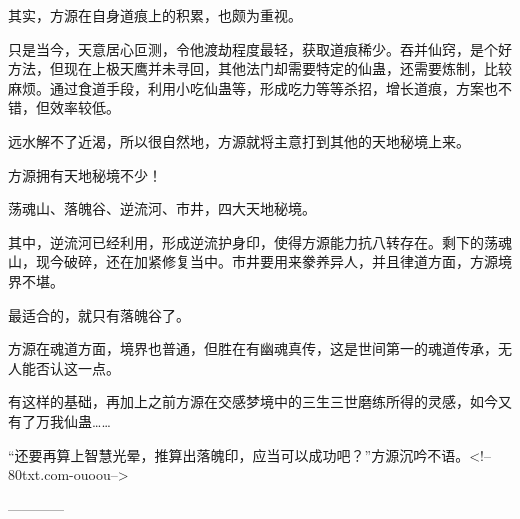 \begin{this_body}
其实，方源在自身道痕上的积累，也颇为重视。

只是当今，天意居心叵测，令他渡劫程度最轻，获取道痕稀少。吞并仙窍，是个好方法，但现在上极天鹰并未寻回，其他法门却需要特定的仙蛊，还需要炼制，比较麻烦。通过食道手段，利用小吃仙蛊等，形成吃力等等杀招，增长道痕，方案也不错，但效率较低。

远水解不了近渴，所以很自然地，方源就将主意打到其他的天地秘境上来。

方源拥有天地秘境不少！

荡魂山、落魄谷、逆流河、市井，四大天地秘境。

其中，逆流河已经利用，形成逆流护身印，使得方源能力抗八转存在。剩下的荡魂山，现今破碎，还在加紧修复当中。市井要用来豢养异人，并且律道方面，方源境界不堪。

最适合的，就只有落魄谷了。

方源在魂道方面，境界也普通，但胜在有幽魂真传，这是世间第一的魂道传承，无人能否认这一点。

有这样的基础，再加上之前方源在交感梦境中的三生三世磨练所得的灵感，如今又有了万我仙蛊……

“还要再算上智慧光晕，推算出落魄印，应当可以成功吧？”方源沉吟不语。<!--80txt.com-ouoou-->

------------

\end{this_body}

